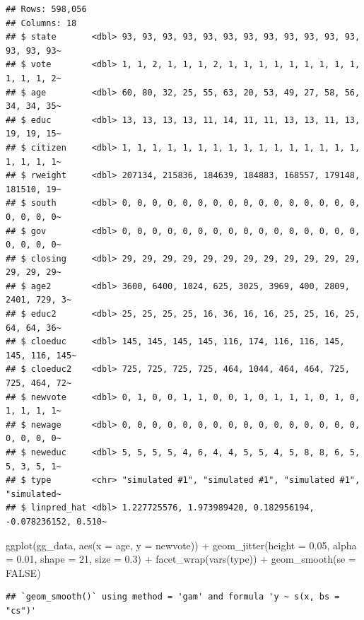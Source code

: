 \documentclass[
]{book}
\newenvironment{Shaded}{\begin{snugshade}}{\end{snugshade}}
\newcommand{\AttributeTok}[1]{\textcolor[rgb]{0.77,0.63,0.00}{#1}}
\newcommand{\ConstantTok}[1]{\textcolor[rgb]{0.00,0.00,0.00}{#1}}
\newcommand{\DecValTok}[1]{\textcolor[rgb]{0.00,0.00,0.81}{#1}}
\newcommand{\FloatTok}[1]{\textcolor[rgb]{0.00,0.00,0.81}{#1}}
\newcommand{\FunctionTok}[1]{\textcolor[rgb]{0.00,0.00,0.00}{#1}}
\newcommand{\NormalTok}[1]{#1}
\newcommand{\SpecialCharTok}[1]{\textcolor[rgb]{0.00,0.00,0.00}{#1}}
\begin{document}
\begin{verbatim}
## Rows: 598,056
## Columns: 18
## $ state       <dbl> 93, 93, 93, 93, 93, 93, 93, 93, 93, 93, 93, 93, 93, 93, 93~
## $ vote        <dbl> 1, 1, 2, 1, 1, 1, 2, 1, 1, 1, 1, 1, 1, 1, 1, 1, 1, 1, 1, 2~
## $ age         <dbl> 60, 80, 32, 25, 55, 63, 20, 53, 49, 27, 58, 56, 34, 34, 35~
## $ educ        <dbl> 13, 13, 13, 13, 11, 14, 11, 11, 13, 13, 11, 13, 19, 19, 15~
## $ citizen     <dbl> 1, 1, 1, 1, 1, 1, 1, 1, 1, 1, 1, 1, 1, 1, 1, 1, 1, 1, 1, 1~
## $ rweight     <dbl> 207134, 215836, 184639, 184883, 168557, 179148, 181510, 19~
## $ south       <dbl> 0, 0, 0, 0, 0, 0, 0, 0, 0, 0, 0, 0, 0, 0, 0, 0, 0, 0, 0, 0~
## $ gov         <dbl> 0, 0, 0, 0, 0, 0, 0, 0, 0, 0, 0, 0, 0, 0, 0, 0, 0, 0, 0, 0~
## $ closing     <dbl> 29, 29, 29, 29, 29, 29, 29, 29, 29, 29, 29, 29, 29, 29, 29~
## $ age2        <dbl> 3600, 6400, 1024, 625, 3025, 3969, 400, 2809, 2401, 729, 3~
## $ educ2       <dbl> 25, 25, 25, 25, 16, 36, 16, 16, 25, 25, 16, 25, 64, 64, 36~
## $ cloeduc     <dbl> 145, 145, 145, 145, 116, 174, 116, 116, 145, 145, 116, 145~
## $ cloeduc2    <dbl> 725, 725, 725, 725, 464, 1044, 464, 464, 725, 725, 464, 72~
## $ newvote     <dbl> 0, 1, 0, 0, 1, 1, 0, 0, 1, 0, 1, 1, 1, 0, 1, 0, 1, 1, 1, 1~
## $ newage      <dbl> 0, 0, 0, 0, 0, 0, 0, 0, 0, 0, 0, 0, 0, 0, 0, 0, 0, 0, 0, 0~
## $ neweduc     <dbl> 5, 5, 5, 5, 4, 6, 4, 4, 5, 5, 4, 5, 8, 8, 6, 5, 5, 3, 5, 1~
## $ type        <chr> "simulated #1", "simulated #1", "simulated #1", "simulated~
## $ linpred_hat <dbl> 1.227725576, 1.973989420, 0.182956194, -0.078236152, 0.510~
\end{verbatim}

\begin{Shaded}
\begin{Highlighting}[]
\FunctionTok{ggplot}\NormalTok{(gg\_data, }\FunctionTok{aes}\NormalTok{(}\AttributeTok{x =}\NormalTok{ age, }\AttributeTok{y =}\NormalTok{ newvote)) }\SpecialCharTok{+} 
  \FunctionTok{geom\_jitter}\NormalTok{(}\AttributeTok{height =} \FloatTok{0.05}\NormalTok{, }\AttributeTok{alpha =} \FloatTok{0.01}\NormalTok{, }\AttributeTok{shape =} \DecValTok{21}\NormalTok{, }\AttributeTok{size =} \FloatTok{0.3}\NormalTok{) }\SpecialCharTok{+} 
  \FunctionTok{facet\_wrap}\NormalTok{(}\FunctionTok{vars}\NormalTok{(type)) }\SpecialCharTok{+} 
  \FunctionTok{geom\_smooth}\NormalTok{(}\AttributeTok{se =} \ConstantTok{FALSE}\NormalTok{)}
\end{Highlighting}
\end{Shaded}

\begin{verbatim}
## `geom_smooth()` using method = 'gam' and formula 'y ~ s(x, bs = "cs")'
\end{verbatim}
\end{document}
